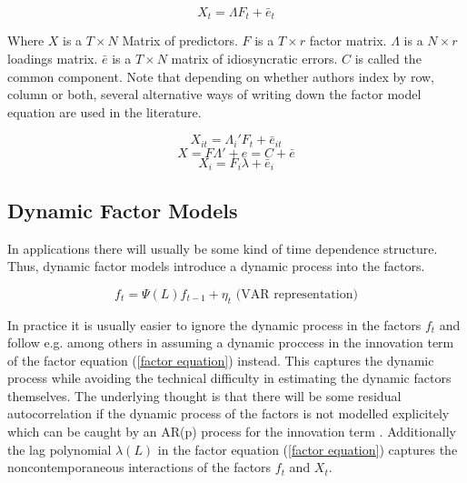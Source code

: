 \documentclass[12pt]{article}
\begin{document}
\begin{equation}
	\label{factor equation, t indexed}
	X_t = \Lambda F_t + \bar e_t
\end{equation}

Where $X$ is a $T \times N$ Matrix of predictors. $F$ is a $T \times r$ factor matrix. $\Lambda$ is a $N \times r$ loadings matrix. $\bar e$ is a $T \times N$ matrix of idiosyncratic errors. $C$ is called the common component.
Note that depending on whether authors index by row, column or both, several alternative ways of writing down the factor model equation are used in the literature.

\begin{equation}
	\label{factor equation, it indexed}
	X_{it} = \Lambda_i' F_t + \bar e_{it}
\end{equation}
\begin{equation}
	\label{static factor equation}
	X = F \Lambda' + e = C + \bar e
\end{equation}
\begin{equation}
	\label{factor equation, i indexed}
	X_i = F_i \lambda + \bar e_i
\end{equation}





\subsection{Dynamic Factor Models}
In applications there will usually be some kind of time dependence structure. Thus, dynamic factor models introduce a dynamic process into the factors.

\begin{equation}
	\label{time dependence of factors}
	f_t = \Psi(L) f_{t-1} + \eta_t \text{\ \ \ \ \ (VAR representation)}
\end{equation}

In practice it is usually easier to ignore the dynamic process in the factors $f_t$ and follow e.g. \citet{stock2005implications} among others in assuming a dynamic proccess in the innovation term of the factor equation (\ref{factor equation}) instead. This captures the dynamic process while avoiding the technical difficulty in estimating the dynamic factors themselves. The underlying thought is that there will be some residual autocorrelation if the dynamic process of the factors is not modelled explicitely which can be caught by an AR(p) process for the innovation term \citep{breitung2011gls}. Additionally the lag polynomial $\lambda(L)$ in the factor equation (\ref{factor equation}) captures the noncontemporaneous interactions of the factors $f_t$ and $X_t$.
\end{document}
